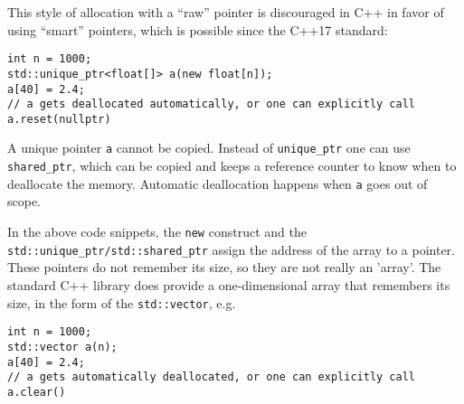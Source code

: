 \documentclass[11pt,twoside]{article}
\begin{document}
This style of allocation with a
``raw'' pointer is discouraged in C++ in favor of using ``smart''
pointers, which is possible since the C++17 standard:
\vspace{-5pt}\begin{framed}\vspace{-14pt}%
\begin{verbatim}
int n = 1000;
std::unique_ptr<float[]> a(new float[n]); 
a[40] = 2.4;
// a gets deallocated automatically, or one can explicitly call a.reset(nullptr)
\end{verbatim}%
\vspace{-12pt}\end{framed}\vspace{-5pt}\noindent%
A unique pointer \texttt{a} cannot be copied.  Instead of
\texttt{unique\_ptr} one can use \texttt{shared\_ptr}, which can be
copied and keeps a reference counter to know when to deallocate the
memory.  Automatic deallocation happens when \texttt{a} goes out of scope.

In the above code snippets, the \texttt{new} construct and the
\texttt{std::unique\_ptr/std::shared\_ptr} assign the address of the
array to a pointer. These pointers do not remember its size, so they are not really an 'array'.  The standard C++ library does provide a one-dimensional array that remembers its size, in the form of the \texttt{std::vector}, e.g.
\vspace{-5pt}\begin{framed}\vspace{-14pt}%
\begin{verbatim}
int n = 1000;
std::vector a(n);
a[40] = 2.4;
// a gets automatically deallocated, or one can explicitly call a.clear()
\end{verbatim}%
\vspace{-12pt}\end{framed}\vspace{-5pt}%
\end{document}
